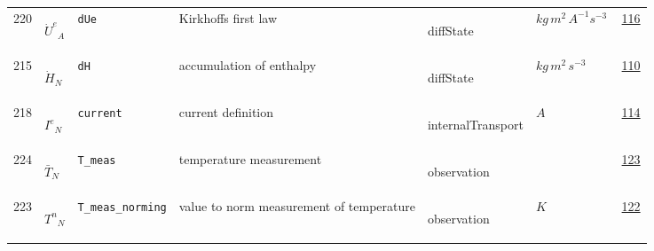 \begin{longtable}{|p{1cm}|p{2.5cm}|p{4.5cm}|p{8cm}|p{3.0cm}|p{3cm}|p{1cm}|}
                 \\
            220
             & \hypertarget{"v:220"}{ $ {{\dot{U}^e}}{_{A}} $}
             & \verb|dUe|
             & Kirkhoffs first law
             & \begin{lay}diffState \end{lay}
             & $ kg \,m^{2} \,A^{-1} s^{-3} \, $
             &                 \hyperlink{"e:116"}{ 116 }
                 \\
            215
             & \hypertarget{"v:215"}{ $ {{\dot{H}}}{_{N}} $}
             & \verb|dH|
             & accumulation of enthalpy
             & \begin{lay}diffState \end{lay}
             & $ kg \,m^{2} \,s^{-3} \, $
             &                 \hyperlink{"e:110"}{ 110 }
                 \\
            218
             & \hypertarget{"v:218"}{ $ {{I^e}}{_{N}} $}
             & \verb|current|
             & current definition
             & \begin{lay}internalTransport \end{lay}
             & $ A \, $
             &                 \hyperlink{"e:114"}{ 114 }
                 \\
            224
             & \hypertarget{"v:224"}{ $ {{\bar{T}}}{_{N}} $}
             & \verb|T_meas|
             & temperature measurement
             & \begin{lay}observation \end{lay}
             & $  $
             &                 \hyperlink{"e:123"}{ 123 }
                 \\
            223
             & \hypertarget{"v:223"}{ $ {{T^n}}{_{N}} $}
             & \verb|T_meas_norming|
             & value to norm measurement of temperature
             & \begin{lay}observation \end{lay}
             & $ K \, $
             &                 \hyperlink{"e:122"}{ 122 }
                 \\
    \end{longtable}